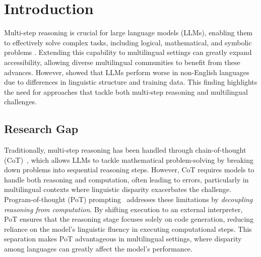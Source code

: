 


\section{Introduction}

%
Multi-step reasoning is crucial for large language models (LLMs), enabling them to effectively solve complex tasks, including logical, mathematical, and symbolic problems
\cite{og-cot-prompt, tot}.
%
Extending this capability to multilingual settings can greatly expand accessibility, allowing diverse multilingual communities to benefit from these advances. 
% 
However, \citet{mgsm, mathoctopus} showed that LLMs perform worse in non-English languages due to differences in linguistic structure and training data. 
%
This finding highlights the need for approaches that tackle both multi-step reasoning and multilingual challenges.

\subsection{Research Gap}

Traditionally, multi-step reasoning has been handled through chain-of-thought (CoT)~\cite{og-cot-prompt}, which allows LLMs to tackle mathematical problem-solving by breaking down problems into sequential reasoning steps.
%
However, CoT requires models to handle both reasoning and computation, often leading to errors, particularly in multilingual contexts where linguistic disparity exacerbates the challenge. 
% 
Program-of-thought (PoT) prompting~\cite{pot, pal} addresses these limitations by \emph{decoupling reasoning from computation}.
%
By shifting execution to an external interpreter, PoT ensures that the reasoning stage focuses solely on code generation, reducing reliance on the model's linguistic fluency in executing computational steps. 
%
This separation makes PoT advantageous in multilingual settings, where disparity among languages can greatly affect the model's performance.


